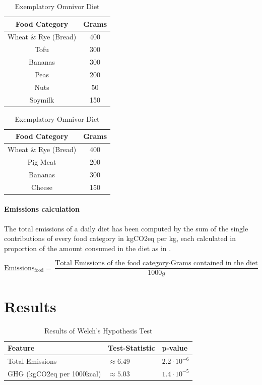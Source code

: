 \documentclass{article}
\begin{document}
\begin{table}[h]
\parbox{.45\linewidth}{
  \caption{Exemplatory Plant-based  Diet}
\centering
\begin{tabular}{c c}
\toprule
Food Category & Grams\\
\midrule
Wheat \& Rye (Bread) & 400\\
Tofu & 300\\
Bananas & 300\\
Peas & 200\\
Nuts & 50\\
Soymilk & 150\\
\bottomrule
\end{tabular}
\label{tbl:plantdiet}
}
\hfill
\parbox{.45\linewidth}{
  \caption{Exemplatory Omnivor  Diet}
\centering
\begin{tabular}{c c}
\toprule
Food Category & Grams\\
\midrule
Wheat \& Rye (Bread) & 400\\
Pig Meat & 200\\
Bananas & 300\\
Cheese & 150\\
\bottomrule
\end{tabular}
\label{tbl:omnidiet}
}
\end{table}

\paragraph*{Emissions calculation} The total emissions of a daily diet has been computed by the sum of the single contributions of every food category in kgCO2eq per kg, each calculated in proportion of the amount consumed in the diet as in .

\begin{equation}\label{eq:diet}
  \textrm{Emissions}_{\textrm{food}} = \frac{\textrm{Total Emissions of the food category} \cdot \textrm{Grams contained in the diet}}{1000g}
\end{equation}

\section{Results}
\begin{table}[h]
  \caption{Results of  Welch's Hypothesis Test}
  \label{tbl:results-test}
  \centering
  \begin{tabular}{lll}
    \toprule
    Feature     & Test-Statistic   & p-value  \\
    \midrule
    Total Emissions &$\approx 6.49$  & $ 2.2\cdot10^{-6}  $  \\
    GHG (kgCO2eq per 1000kcal)    & $\approx 5.03 $  & $ 1.4\cdot10^{-5}$    \\
    \bottomrule
  \end{tabular}
\end{table}
\end{document}
